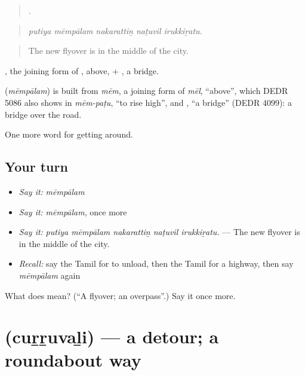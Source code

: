 \begin{quote}
    .
\end{quote}

\begin{quote}
\emph{putiya mēmpālam nakarattiṉ naṭuvil irukkiṟatu.}
\end{quote}

\begin{quote}
The new flyover is in the middle of the city.
\end{quote}

, the joining form of , above, + , a bridge.

\begin{cousinweb}
\textbf{} (\emph{mēmpālam}) is built from \emph{mēm}, a joining form of \emph{mēl}, \textquotedblleft{}above\textquotedblright{}, which DEDR 5086 also shows in \emph{mēm-paṭu}, \textquotedblleft{}to rise high\textquotedblright{}, and , \textquotedblleft{}a bridge\textquotedblright{} (DEDR 4099): a bridge over the road.
\end{cousinweb}

\begin{grammarlens}[title={What you've built}]
One more word for getting around.
\end{grammarlens}

\subsection*{Your turn}
\begin{itemize}
\raggedright
  \item \emph{Say it:} \emph{mēmpālam}
  \item \emph{Say it:} \emph{mēmpālam}, once more
  \item \emph{Say it:} \emph{putiya mēmpālam nakarattiṉ naṭuvil irukkiṟatu.} — The new flyover is in the middle of the city.
  \item \emph{Recall:} say the Tamil for to unload, then the Tamil for a highway, then say \emph{mēmpālam} again
\end{itemize}

\begin{tcolorbox}[breakable,colback=teal!4,colframe=teal!35!black,title={Before you move on}]
What does  mean? (\textquotedblleft{}A flyover; an overpass\textquotedblright{}.) Say it once more.
\end{tcolorbox}
\section[\texorpdfstring{\ta{சுற்றுவழி} (cuṟṟuvaḻi)}{சுற்றுவழி (cuṟṟuvaḻi)}]{ (cuṟṟuvaḻi) — a detour; a roundabout way}

